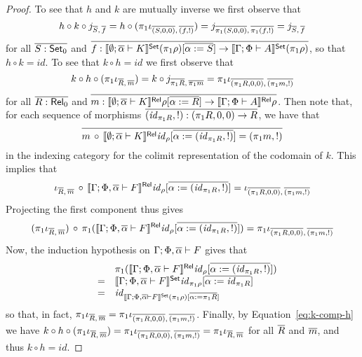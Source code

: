 \documentclass{lmcs}
\theoremstyle{plain}\newtheorem{satz}[thm]{Satz}
\newcommand{\set}{\mathsf{Set}}
\renewcommand{\id}{\mathit{id}}
\begin{document}
{\begin{proof}
To see that $h$ and $k$ are mutually inverse we first observe that
\[
h \circ k \circ j_{\overline{S},\, \overline{f}}
= h \circ (\pi_1 \iota_{\overline{(S, 0, 0)}, \,\overline{(f, !)}})
= j_{\overline{\pi_1 (S, 0, 0)}, \,\overline{\pi_1 (f, !)}}
= j_{\overline{S},\, \overline{f}}
\]
for all $\ol{S : \set_0}$ and $\ol{f : \setsem{ \emptyset; \ol\alpha
    \vdash K } (\pi_1 \rho)[\ol{\alpha := S}] \to \setsem{ \Gamma;
    \Phi \vdash A } (\pi_1 \rho)}$, so that $h \circ k = \id$.
To see that  $k \circ h  = \id$ we first observe that
\begin{equation}\label{eq:k-comp-h}
k \circ h \circ (\pi_1 \iota_{\overline{R},\, \overline{m}}) = k \circ
j_{\overline{\pi_1 R}, \,\overline{\pi_1 m}} = \pi_1 \iota_{\overline{(\pi_1 R, 0,
    0)},\, \overline{(\pi_1 m, !)}}
\end{equation}
for all $\overline{R : \mathsf{Rel}_0}$ and $\overline{m : \llbracket{ \emptyset; \overline{\alpha}
    \vdash K }\rrbracket^{\mathsf{Rel}} \rho[\overline{\alpha := R}] \to \llbracket{ \Gamma; \Phi \vdash
    A }\rrbracket^{\mathsf{Rel}} \rho}$. Then note that, for each sequence of morphisms
$\ol{(\id_{\pi_1 R}, !) : (\pi_1 R, 0, 0) \to R}$, we have that
\[\ol{m
\,\circ\, \relsem{ \emptyset; \ol\alpha \vdash K } \id_\rho[\ol{\alpha
    := (\id_{\pi_1 R}, !)}] = (\pi_1 m, !)}\]
in the indexing category for the colimit representation of the
codomain of $k$. This implies that
\[\iota_{\ol{R},\, \ol{m}} \,\circ\, \relsem{ \Gamma; \Phi,
  \ol\alpha \vdash F } \id_{\rho}[\ol{\alpha := (\id_{\pi_1 R}, !)}]
= \iota_{\ol{(\pi_1 R, 0, 0)},\, \ol{(\pi_1 m, !)}}\] Projecting the
first component thus gives
\[(\pi_1 \iota_{\ol{R},\,
  \ol{m}}) \, \circ\, \pi_1 ( \relsem{ \Gamma; \Phi, \ol\alpha \vdash
  F } \id_{\rho}[\ol{\alpha := (\id_{\pi_1 R}, !)}]) = \pi_1
\iota_{\ol{(\pi_1 R, 0, 0)},\, \ol{(\pi_1 m, !)}}\]
Now, the induction hypothesis on $\Gamma;\Phi,\overline{\alpha}
\vdash F$ gives that
\[\begin{array}{lll}
 &  & \pi_1 ( \relsem{ \Gamma; \Phi, \ol\alpha \vdash F}
\id_{\rho}[\ol{\alpha := (\id_{\pi_1 R}, !)}])\\
& = & \setsem{ \Gamma; \Phi, \ol\alpha \vdash F } \id_{\pi_1
  \rho}[\ol{\alpha := \id_{\pi_1 R}}]\\
& = & \id_{\setsem{ \Gamma; \Phi, \ol\alpha \vdash F } (\pi_1
  \rho)[\ol{\alpha := \pi_1 R}]}
\end{array}\]
so that, in fact, $\pi_1 \iota_{\overline{R},\,\overline{m}} =
\pi_1\iota_{\overline{(\pi_1 R, 0, 0)},\, \overline{(\pi_1 m, !)}}$.  Finally, by
Equation~\ref{eq:k-comp-h} we have $k \circ h \circ (\pi_1
\iota_{\overline{R},\, \overline{m}}) = \pi_1 \iota_{\overline{(\pi_1 R, 0, 0)},\,
  \overline{(\pi_1 m, !)}}  = \pi_1 \iota_{\overline{R},\, \overline{m}}$ for all $\overline{R}$ and $\overline{m}$, and thus $k \circ h = \id$.


\end{proof}}
\end{document}
